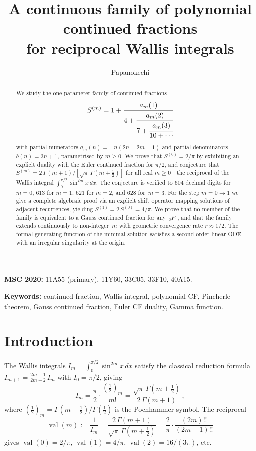 \documentclass[11pt]{article}
\title{A continuous family of polynomial continued fractions\\
for reciprocal Wallis integrals}
\author{Papanokechi}
\date{}
\newcommand{\half}{\tfrac{1}{2}}
\newcommand{\val}{\operatorname{val}}
\theoremstyle{definition}
\theoremstyle{remark}
\begin{document}
\maketitle

\begin{abstract}
We study the one-parameter family of continued fractions
\[
  S^{(m)} = 1 + \cfrac{a_m(1)}{4 + \cfrac{a_m(2)}{7 + \cfrac{a_m(3)}{10+\cdots}}}
\]
with partial numerators $a_m(n) = -n(2n-2m-1)$ and partial denominators
$b(n) = 3n+1$, parametrised by $m \geq 0$.
We prove that $S^{(0)} = 2/\pi$ by exhibiting an explicit duality with the
Euler continued fraction for $\pi/2$, and conjecture that
$S^{(m)} = 2\,\Gamma(m{+}1)/[\sqrt{\pi}\,\Gamma(m{+}\half)]$
for all real $m \geq 0$---the reciprocal of the Wallis integral
$\int_0^{\pi/2}\sin^{2m}x\,dx$.
The conjecture is verified to
$604$ decimal digits for $m=0$, $613$ for $m=1$,
$621$ for $m=2$, and $628$ for~$m=3$.
For the step $m{=}0 \to 1$ we give a complete algebraic proof via
an explicit shift operator mapping solutions of adjacent recurrences,
yielding $S^{(1)} = 2\,S^{(0)} = 4/\pi$.
We prove that no member of the family is equivalent to a Gauss
continued fraction for any~${}_2F_1$, and that the family extends
continuously to non-integer~$m$ with geometric convergence rate $r \approx 1/2$.
The formal generating function of the minimal solution satisfies
a second-order linear ODE with an irregular singularity at the origin.
\end{abstract}

\noindent\textbf{MSC 2020:}
11A55 (primary), 11Y60, 33C05, 33F10, 40A15.

\medskip\noindent\textbf{Keywords:}
continued fraction, Wallis integral, polynomial CF, Pincherle theorem,
Gauss continued fraction, Euler CF duality, Gamma function.

\section{Introduction}\label{sec:intro}

The Wallis integrals $I_m = \int_0^{\pi/2}\sin^{2m}x\,dx$ satisfy
the classical reduction formula $I_{m+1} = \frac{2m+1}{2m+2}\,I_m$
with $I_0 = \pi/2$, giving
\begin{equation}\label{eq:wallis}
  I_m = \frac{\pi}{2}\cdot\frac{(\half)_m}{m!}
      = \frac{\sqrt{\pi}\,\Gamma(m{+}\half)}{2\,\Gamma(m{+}1)}\,,
\end{equation}
where $(\half)_m = \Gamma(m{+}\half)/\Gamma(\half)$ is the
Pochhammer symbol.  The reciprocal
\begin{equation}\label{eq:valm}
  \val(m) := \frac{1}{I_m}
  = \frac{2\,\Gamma(m{+}1)}{\sqrt{\pi}\,\Gamma(m{+}\half)}
  = \frac{2}{\pi}\cdot\frac{(2m)!!}{(2m{-}1)!!}
\end{equation}
gives $\val(0) = 2/\pi$, $\val(1) = 4/\pi$,
$\val(2) = 16/(3\pi)$, etc.
\end{document}
